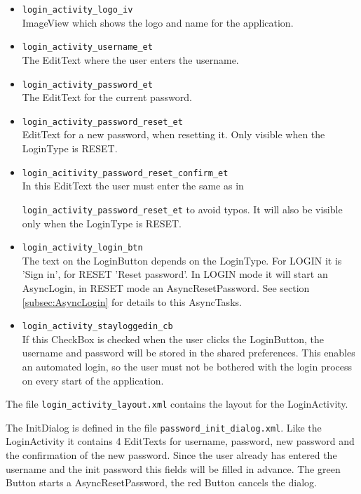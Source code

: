 \documentclass[12pt,a4paper,oneside]{report}
\newcommand{\code}[1]{\lstinline{#1}}
\begin{document}
\begin{itemize}
\item \code{login_activity_logo_iv}\\
ImageView which shows the logo and name for the application.

\item \code{login_activity_username_et}\\
The EditText where the user enters the username.

\item \code{login_activity_password_et}\\
The EditText for the current password.

\item \code{login_activity_password_reset_et}\\
EditText for a new password, when resetting it. Only visible when the LoginType is RESET.

\item \code{login_acitivity_password_reset_confirm_et}\\
In this EditText the user must enter the same as in

\code{login_activity_password_reset_et} to avoid typos. It will also be visible only when the LoginType is RESET.

\item \code{login_activity_login_btn}\\
The text on the LoginButton depends on the LoginType. For LOGIN it is 'Sign in', for RESET 'Reset password'. In LOGIN mode it will start an AsyncLogin, in RESET mode an AsyncResetPassword. See section \ref{subsec:AsyncLogin} for details to this AsyncTasks.

\item \code{login_activity_stayloggedin_cb}\\
If this CheckBox is checked when the user clicks the LoginButton, the username and password will be stored in the shared preferences. This enables an automated login, so the user must not be bothered with the login process on every start of the application.
\end{itemize}

The file \code{login_activity_layout.xml} contains the layout for the LoginActivity. 

The InitDialog is defined in the file \code{password_init_dialog.xml}. Like the LoginActivity it contains 4 EditTexts for username, password, new password and the confirmation of the new password. Since the user already has entered the username and the init password this fields will be filled in advance. The green Button starts a AsyncResetPassword, the red Button cancels the dialog. 
\end{document}
